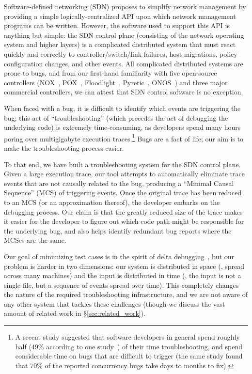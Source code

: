 Software-defined networking (SDN) proposes to simplify network management by
providing a simple logically-centralized API upon which network management
programs can be written. However, the software used to support this API is
anything but simple: the SDN control plane (consisting of the network
operating system and higher layers) is a complicated distributed system that
must react quickly and correctly to controller/switch/link failures, host migrations,
policy-configuration changes, and other events.
All complicated distributed systems are prone to bugs, and from our first-hand
familiarity with five open-source controllers (NOX~\cite{nox},
POX~\cite{pox}, Floodlight~\cite{floodlight},
Pyretic~\cite{frenetic}, ONOS~\cite{ONOS}) and three major commercial controllers, we can
attest that SDN control software is no exception.

When faced with a bug, it is difficult to identify which events are triggering the
bug; this act of ``troubleshooting'' (which precedes the act of debugging the
underlying code) is extremely time-consuming, as developers spend many hours poring
over multigigabyte execution traces.\footnote{A recent study suggested that software developers in general spend roughly half (49\% according to one
study~\cite{msoft_concurrency}) of their time troubleshooting, and spend
considerable time on bugs that are difficult to trigger (the same study found
that 70\% of the reported concurrency bugs take days to months to fix).} Bugs
are a fact of life; our aim is to make the troubleshooting process easier.

To that end, we have built a troubleshooting system for the SDN control plane.
Given a large execution trace, our tool attempts to automatically eliminate
trace events that are not causally related to the bug, producing a ``Minimal
Causal Sequence'' (MCS) of triggering events. Once the original trace has
been reduced to an MCS (or an approximation thereof), the developer embarks
on the debugging process. Our claim is that the greatly reduced size of the
trace makes it easier for the developer to figure out which code path might be
responsible for the underlying bug, and also helps identify redundant bug
reports where the MCSes are the same.

Our goal of minimizing test cases is in the spirit of delta debugging~\cite{Zeller:1999:YMP:318773.318946}, but our
problem is harder in two dimensions: our system is distributed in space (\ie,
spread across many machines) and the input is distributed in time (\ie, the
input is not a single file, but a sequence of events spread over time). This
completely changes the nature of the required troubleshooting infrastructure,
and we are not aware of any other system that tackles these challenges (though
we discuss the vast amount of related work in \S\ref{sec:related_work}).

